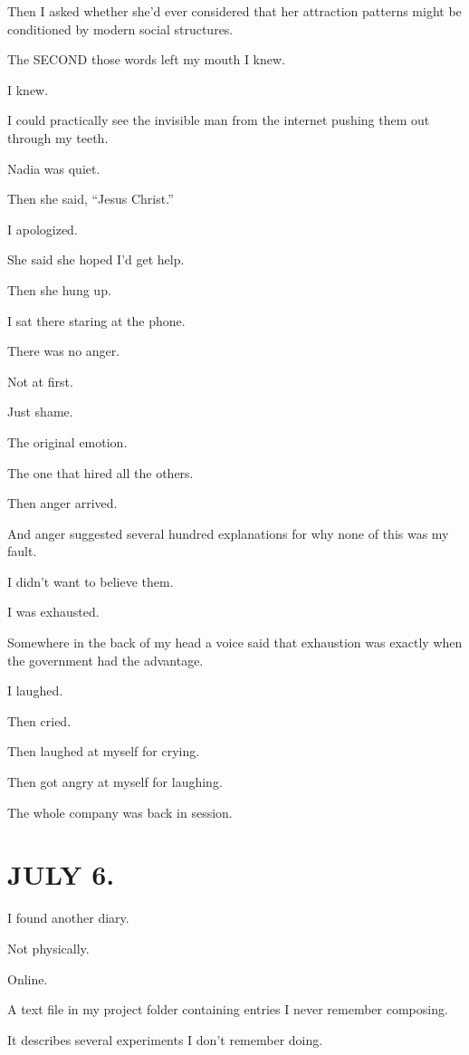 \documentclass[11pt,oneside]{book}
\begin{document}
Then I asked whether she'd ever considered that her attraction patterns might be conditioned by modern social structures.

The SECOND those words left my mouth I knew.

I knew.

I could practically see the invisible man from the internet pushing them out through my teeth.

Nadia was quiet.

Then she said, ``Jesus Christ.''

I apologized.

She said she hoped I'd get help.

Then she hung up.

I sat there staring at the phone.

There was no anger.

Not at first.

Just shame.

The original emotion.

The one that hired all the others.

Then anger arrived.

And anger suggested several hundred explanations for why none of this was my fault.

I didn't want to believe them.

I was exhausted.

Somewhere in the back of my head a voice said that exhaustion was exactly when the government had the advantage.

I laughed.

Then cried.

Then laughed at myself for crying.

Then got angry at myself for laughing.

The whole company was back in session.

\section*{JULY 6.}

I found another diary.

Not physically.

Online.

A text file in my project folder containing entries I never remember composing.

It describes several experiments I don't remember doing.
\end{document}
